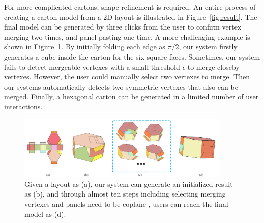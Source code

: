 
For more complicated cartons, shape refinement is required. 
An entire process of creating a carton model from a 2D layout is illustrated in Figure~\ref{fig:result}.
%
The final model can be generated by three clicks from the user to confirm vertex merging two times, and panel pasting one time.
%
A more challenging example is shown in Figure~\ref{fig:hexagon}. 
By initially folding each edge as $\pi/2$, our system firstly generates a cube inside the carton for the six square faces. 
Sometimes, our system fails to detect mergeable vertexes with a small threshold $\epsilon$ to merge closeby vertexes.
%
However, the user could manually select two vertexes to merge. Then our systems automatically detects two symmetric vertexes that also can be merged. 
%
Finally, a hexagonal carton can be generated in a limited number of user interactions.
%



%





\begin{figure}
	\centering
	\includegraphics[width=0.9\textwidth]{images/limitation}
	\caption{Given a layout as (a), our system can generate an initialized result as (b), and through almost ten steps including selecting merging vertexes and panels need to be coplane , users can reach the final model as (d). }
	\label{fig:hexagon}
\end{figure}

